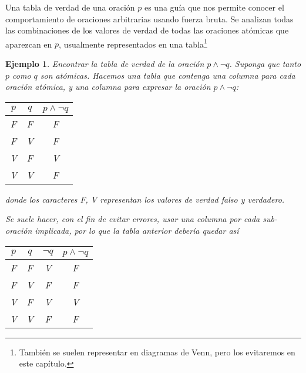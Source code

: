 \documentclass{book}
\newtheorem*{ejm}{Ejemplo}
\begin{document}
Una tabla de verdad de una oración $p$ es una guía que nos permite conocer el comportamiento de oraciones arbitrarias usando fuerza bruta.
Se analizan todas las combinaciones de los valores de verdad de todas las oraciones atómicas que aparezcan en $p$, usualmente representados en una tabla\footnote{También se suelen representar en diagramas de Venn, pero los evitaremos en este capítulo.}
\begin{ejm}
	Encontrar la tabla de verdad de la oración $p \wedge \neg q$. Suponga que tanto $p$ como $q$ son atómicas.
	Hacemos una tabla que contenga una columna para cada oración atómica, y una columna para expresar la oración $p \wedge \neg q$:

	\begin{center}\begin{tabular}{|c|c|c|}
		\hline
		$p$& $q$ & $p \wedge \neg q$ \\
		\hline \hline
		F & F & F \\
		\hline
		F & V & F \\
		\hline
		V & F & V \\
		\hline
		V & V & F \\
		\hline
	\end{tabular}\end{center}
	donde los caracteres F, V representan los valores de verdad falso y verdadero.
	
	Se suele hacer, con el fin de evitar errores, usar una columna por cada \emph{sub-oración} implicada, por lo que la tabla anterior debería quedar así
	\begin{center}\begin{tabular}{|c|c|c|c|}
		\hline
		$p$& $q$ & $\neg q$ &$p \wedge \neg q$ \\
		\hline \hline
		F & F & V & F \\
		\hline
		F & V & F & F \\
		\hline
		V & F & V & V \\
		\hline
		V & V & F & F \\
		\hline
\end{tabular}\end{center} 
\end{ejm}
\end{document}
